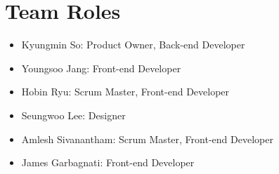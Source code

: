 \documentclass[10pt]{article}
\newcommand{\fancysecX}[2] {{\color{primary}\section*{#1} \label{sec:#2}}}
\newcommand{\fancysubX}[2] {{\color{primary}\subsection*{#1} \label{sec:#2}}}
\begin{document}
     

\fancysecX{Team Roles}{roles}

    \begin{itemize}
        \item Kyungmin So: Product Owner, Back-end Developer
        \item Youngsoo Jang: Front-end Developer
        \item Hobin Ryu: Scrum Master, Front-end Developer
        \item Seungwoo Lee: Designer
        \item Amlesh Sivanantham: Scrum Master, Front-end Developer
        \item James Garbagnati: Front-end Developer
    \end{itemize}
\end{document}
